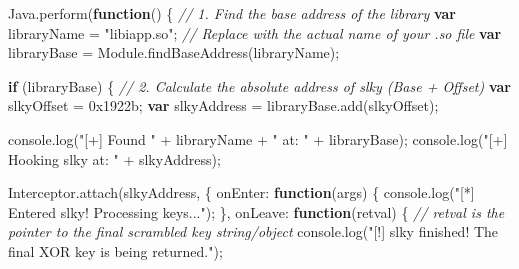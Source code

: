 \documentclass[
]{article}
\newenvironment{Shaded}{}{}
\newcommand{\BaseNTok}[1]{\textcolor[rgb]{0.25,0.63,0.44}{#1}}
\newcommand{\BuiltInTok}[1]{\textcolor[rgb]{0.00,0.50,0.00}{#1}}
\newcommand{\CommentTok}[1]{\textcolor[rgb]{0.38,0.63,0.69}{\textit{#1}}}
\newcommand{\ControlFlowTok}[1]{\textcolor[rgb]{0.00,0.44,0.13}{\textbf{#1}}}
\newcommand{\DataTypeTok}[1]{\textcolor[rgb]{0.56,0.13,0.00}{#1}}
\newcommand{\FunctionTok}[1]{\textcolor[rgb]{0.02,0.16,0.49}{#1}}
\newcommand{\KeywordTok}[1]{\textcolor[rgb]{0.00,0.44,0.13}{\textbf{#1}}}
\newcommand{\NormalTok}[1]{#1}
\newcommand{\OperatorTok}[1]{\textcolor[rgb]{0.40,0.40,0.40}{#1}}
\newcommand{\StringTok}[1]{\textcolor[rgb]{0.25,0.44,0.63}{#1}}
\begin{document}
\begin{Shaded}
\begin{Highlighting}[]
\NormalTok{Java}\OperatorTok{.}\FunctionTok{perform}\NormalTok{(}\KeywordTok{function}\NormalTok{() \{}
    \CommentTok{// 1. Find the base address of the library}
    \KeywordTok{var}\NormalTok{ libraryName }\OperatorTok{=} \StringTok{"libiapp.so"}\OperatorTok{;} \CommentTok{// Replace with the actual name of your .so file}
    \KeywordTok{var}\NormalTok{ libraryBase }\OperatorTok{=}\NormalTok{ Module}\OperatorTok{.}\FunctionTok{findBaseAddress}\NormalTok{(libraryName)}\OperatorTok{;}
    
    \ControlFlowTok{if}\NormalTok{ (libraryBase) \{}
        \CommentTok{// 2. Calculate the absolute address of slky (Base + Offset)}
        \KeywordTok{var}\NormalTok{ slkyOffset }\OperatorTok{=} \BaseNTok{0x1922b}\OperatorTok{;} 
        \KeywordTok{var}\NormalTok{ slkyAddress }\OperatorTok{=}\NormalTok{ libraryBase}\OperatorTok{.}\FunctionTok{add}\NormalTok{(slkyOffset)}\OperatorTok{;}

        \BuiltInTok{console}\OperatorTok{.}\FunctionTok{log}\NormalTok{(}\StringTok{"[+] Found "} \OperatorTok{+}\NormalTok{ libraryName }\OperatorTok{+} \StringTok{" at: "} \OperatorTok{+}\NormalTok{ libraryBase)}\OperatorTok{;}
        \BuiltInTok{console}\OperatorTok{.}\FunctionTok{log}\NormalTok{(}\StringTok{"[+] Hooking slky at: "} \OperatorTok{+}\NormalTok{ slkyAddress)}\OperatorTok{;}

\NormalTok{        Interceptor}\OperatorTok{.}\FunctionTok{attach}\NormalTok{(slkyAddress}\OperatorTok{,}\NormalTok{ \{}
            \DataTypeTok{onEnter}\OperatorTok{:} \KeywordTok{function}\NormalTok{(args) \{}
                \BuiltInTok{console}\OperatorTok{.}\FunctionTok{log}\NormalTok{(}\StringTok{"[*] Entered slky! Processing keys..."}\NormalTok{)}\OperatorTok{;}
\NormalTok{            \}}\OperatorTok{,}
            \DataTypeTok{onLeave}\OperatorTok{:} \KeywordTok{function}\NormalTok{(retval) \{}
                \CommentTok{// retval is the pointer to the final scrambled key string/object}
                \BuiltInTok{console}\OperatorTok{.}\FunctionTok{log}\NormalTok{(}\StringTok{"[!] slky finished! The final XOR key is being returned."}\NormalTok{)}\OperatorTok{;}
                

\end{Highlighting}
\end{Shaded}
\end{document}
